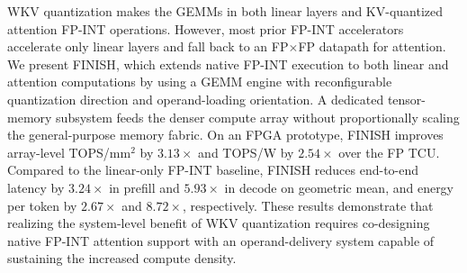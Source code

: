 \documentclass[sigconf,anonymous,nonacm]{acmart}
\newcommand{\ours}{\textsc{FINISH}}
\newcommand{\fpint}{FP-INT}
\begin{document}
WKV quantization makes the GEMMs in both linear layers and KV-quantized attention \fpint{} operations. However, most prior \fpint{} accelerators accelerate only linear layers and fall back to an FP$\times$FP datapath for attention. We present \ours{}, which extends native \fpint{} execution
to both linear and attention computations by using a GEMM engine with reconfigurable quantization direction and operand-loading orientation.
A dedicated tensor-memory subsystem feeds the denser compute array without proportionally scaling the general-purpose memory fabric. On an FPGA prototype, \ours{} improves array-level TOPS/mm$^2$
by $3.13\times$ and TOPS/W by $2.54\times$ over the FP TCU. Compared to
the linear-only \fpint{} baseline, \ours{} reduces
end-to-end latency by $3.24\times$ in prefill and $5.93\times$ in decode
on geometric mean, and energy per
token by $2.67\times$ and $8.72\times$, respectively.
These results demonstrate that realizing the system-level benefit of WKV quantization requires co-designing native \fpint{} attention support with an operand-delivery system capable of sustaining the increased compute density. 







\end{document}
